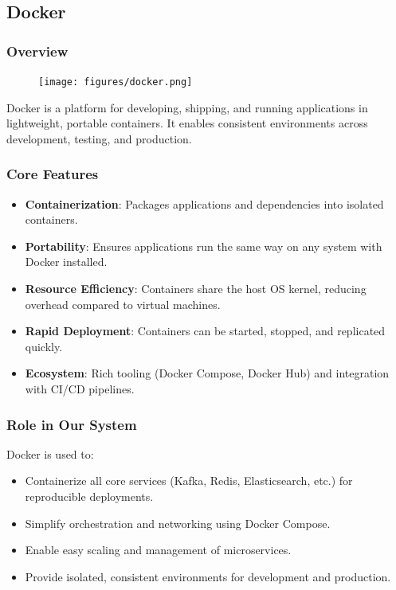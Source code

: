 \subsection{Docker}

\subsubsection{Overview}

\begin{figure}
    \vspace{-10pt}
    \texttt{[image: figures/docker.png]}
    \vspace{-10pt}
\end{figure}

Docker is a platform for developing, shipping, and running applications in lightweight, portable containers. It enables consistent environments across development, testing, and production.

\subsubsection{Core Features}
\begin{itemize}
    \item \textbf{Containerization}: Packages applications and dependencies into isolated containers.
    \item \textbf{Portability}: Ensures applications run the same way on any system with Docker installed.
    \item \textbf{Resource Efficiency}: Containers share the host OS kernel, reducing overhead compared to virtual machines.
    \item \textbf{Rapid Deployment}: Containers can be started, stopped, and replicated quickly.
    \item \textbf{Ecosystem}: Rich tooling (Docker Compose, Docker Hub) and integration with CI/CD pipelines.
\end{itemize}

\subsubsection{Role in Our System}
Docker is used to:
\begin{itemize}
    \item Containerize all core services (Kafka, Redis, Elasticsearch, etc.) for reproducible deployments.
    \item Simplify orchestration and networking using Docker Compose.
    \item Enable easy scaling and management of microservices.
    \item Provide isolated, consistent environments for development and production.
\end{itemize}

